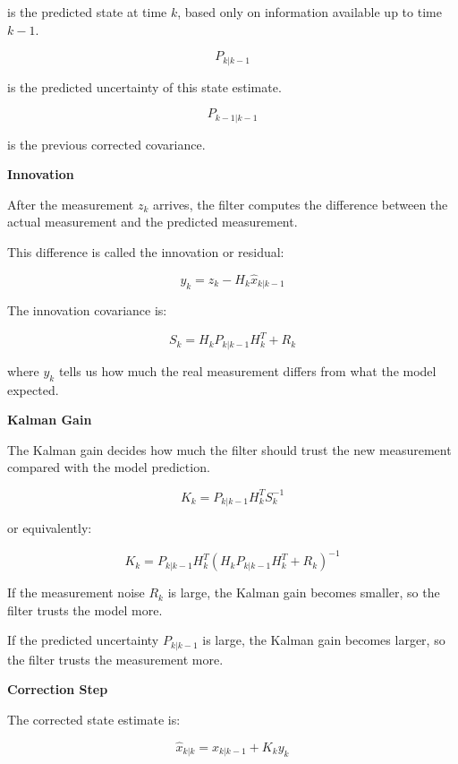\documentclass{book}
\providecommand{\ProjectDeepHeading}[2]{%
    \par\medskip\noindent\textbf{#2}\par\smallskip
}
\begin{document}
        is the predicted state at time \(k\), based only on information available up to time \(k-1\).
        
        \[
            P_{k|k-1}
        \]
        
        is the predicted uncertainty of this state estimate.
        
        \[
            P_{k-1|k-1}
        \]
        
        is the previous corrected covariance.
    
    
    \ProjectDeepHeading{10}{Innovation}
        
        After the measurement \(z_k\) arrives, the filter computes the difference between the actual measurement and the predicted measurement.
        
        This difference is called the innovation or residual:
        
        \[
            y_k = z_k - H_k \hat{x}_{k|k-1}
        \]
        
        The innovation covariance is:
        
        \[
            S_k = H_k P_{k|k-1} H_k^T + R_k
        \]
        
        where \(y_k\) tells us how much the real measurement differs from what the model expected.
    
    
    \ProjectDeepHeading{10}{Kalman Gain}
        
        The Kalman gain decides how much the filter should trust the new measurement compared with the model prediction.
        
        \[
            K_k = P_{k|k-1} H_k^T S_k^{-1}
        \]
        
        or equivalently:
        
        \[
            K_k = P_{k|k-1} H_k^T
            \left(
                H_k P_{k|k-1} H_k^T + R_k
            \right)^{-1}
        \]
        
        If the measurement noise \(R_k\) is large, the Kalman gain becomes smaller, so the filter trusts the model more.
        
        If the predicted uncertainty \(P_{k|k-1}\) is large, the Kalman gain becomes larger, so the filter trusts the measurement more.
    
    
    \ProjectDeepHeading{10}{Correction Step}
        
        The corrected state estimate is:
        
        \[
            \hat{x}_{k|k} =
            \hat{x}_{k|k-1} + K_k y_k
        \]
        
\end{document}
